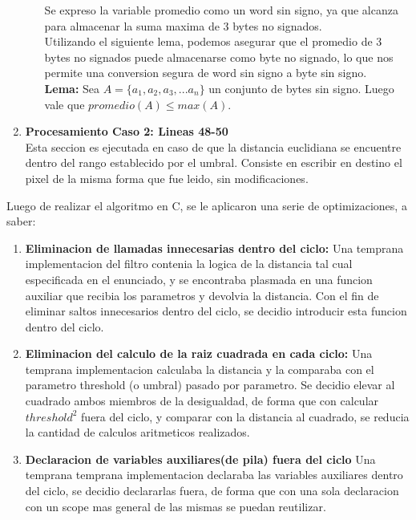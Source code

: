 \begin{enumerate}
\begin{itemize}
        Se expreso la variable promedio como un word sin signo, ya que alcanza para almacenar la suma maxima de 3 bytes no signados.\\
        Utilizando el siguiente lema, podemos asegurar que el promedio de 3 bytes no signados puede almacenarse como byte no signado, lo que nos permite una conversion segura de word sin signo a byte sin signo.\\
        \textbf{Lema: } Sea $ A = \{a_1, a_2, a_3, ... a_n\} $ un conjunto de bytes sin signo. Luego vale que $promedio(A) \leq max(A)$.
      \end{itemize}
    \item \textbf{Procesamiento Caso 2: Lineas 48-50}\\
      Esta seccion es ejecutada en caso de que la distancia euclidiana se encuentre dentro del rango establecido por el umbral. Consiste en escribir en destino el pixel de la misma forma que fue leido, sin modificaciones.
           
\end{enumerate}

Luego de realizar el algoritmo en C, se le aplicaron una serie de optimizaciones, a saber:
\begin{enumerate}
  \item \textbf{Eliminacion de llamadas innecesarias dentro del ciclo:} 
          Una temprana implementacion del filtro contenia la logica de la distancia tal cual especificada en el enunciado, y se encontraba plasmada en una funcion auxiliar que recibia los parametros y devolvia la distancia.
          Con el fin de eliminar saltos innecesarios dentro del ciclo, se decidio introducir esta funcion dentro del ciclo.
  \item \textbf{Eliminacion del calculo de la raiz cuadrada en cada ciclo: }
          Una temprana implementacion calculaba la distancia y la comparaba con el parametro threshold (o umbral) pasado por parametro. Se decidio elevar al cuadrado ambos miembros de la desigualdad, de forma que con calcular $threshold^2$ fuera del ciclo, y comparar con la distancia al cuadrado, se reducia la cantidad de calculos aritmeticos realizados.
  \item \textbf{Declaracion de variables auxiliares(de pila) fuera del ciclo}
          Una temprana temprana implementacion declaraba las variables auxiliares dentro del ciclo, se decidio declararlas fuera, de forma que con una sola declaracion con un scope mas general de las mismas se puedan reutilizar.

\end{enumerate}

